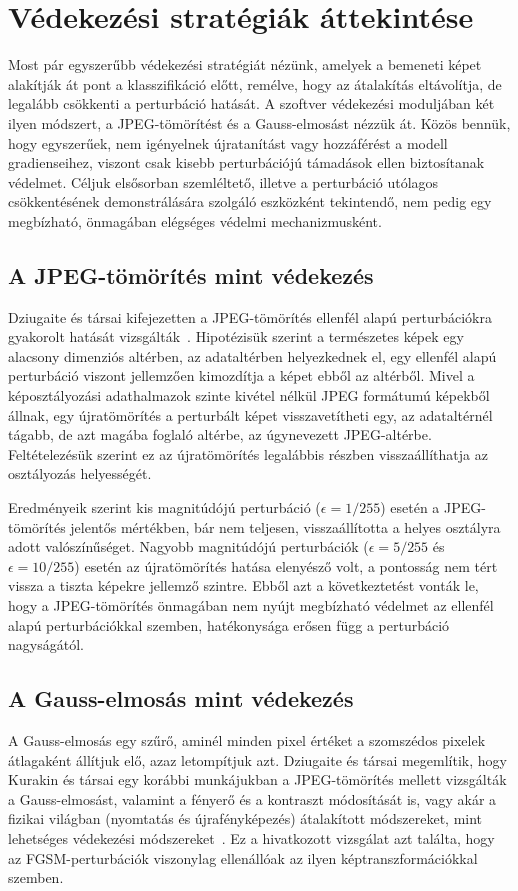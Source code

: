 \section{Védekezési stratégiák áttekintése}
Most pár egyszerűbb védekezési stratégiát nézünk, amelyek a bemeneti képet alakítják át pont a klasszifikáció előtt, remélve, 
hogy az átalakítás eltávolítja, de legalább csökkenti a perturbáció hatását. 
A szoftver védekezési moduljában két ilyen módszert, a JPEG-tömörítést és a Gauss-elmosást nézzük át. 
Közös bennük, hogy egyszerűek, nem igényelnek újratanítást vagy hozzáférést a modell gradienseihez, viszont csak kisebb 
perturbációjú támadások ellen biztosítanak védelmet. 
Céljuk elsősorban szemléltető, illetve a perturbáció utólagos csökkentésének demonstrálására szolgáló eszközként tekintendő, nem 
pedig egy megbízható, önmagában elégséges védelmi mechanizmusként. 

\subsection{A JPEG-tömörítés mint védekezés}
Dziugaite és társai kifejezetten a JPEG-tömörítés ellenfél alapú perturbációkra gyakorolt hatását 
vizsgálták~\cite{dziugaite2016jpeg}. 
Hipotézisük szerint a természetes képek egy alacsony dimenziós altérben, az adataltérben helyezkednek el, egy ellenfél alapú 
perturbáció viszont jellemzően kimozdítja a képet ebből az altérből. 
Mivel a képosztályozási adathalmazok szinte kivétel nélkül JPEG formátumú képekből állnak, egy újratömörítés a perturbált képet 
visszavetítheti egy, az adataltérnél tágabb, de azt magába foglaló altérbe, az úgynevezett JPEG-altérbe. 
Feltételezésük szerint ez az újratömörítés legalábbis részben visszaállíthatja az osztályozás helyességét. 

Eredményeik szerint kis magnitúdójú perturbáció ($\epsilon=1/255$) esetén a JPEG-tömörítés jelentős mértékben, bár nem teljesen, 
visszaállította a helyes osztályra adott valószínűséget. 
Nagyobb magnitúdójú perturbációk ($\epsilon=5/255$ és $\epsilon=10/255$) esetén az újratömörítés hatása elenyésző volt, a 
pontosság nem tért vissza a tiszta képekre jellemző szintre. 
Ebből azt a következtetést vonták le, hogy a JPEG-tömörítés önmagában nem nyújt megbízható védelmet az ellenfél alapú 
perturbációkkal szemben, hatékonysága erősen függ a perturbáció nagyságától. 

\subsection{A Gauss-elmosás mint védekezés}
A Gauss-elmosás egy szűrő, aminél minden pixel értéket a szomszédos pixelek átlagaként állítjuk elő, azaz letompítjuk azt. 
Dziugaite és társai megemlítik, hogy Kurakin és társai egy korábbi munkájukban a JPEG-tömörítés mellett vizsgálták a 
Gauss-elmosást, valamint a fényerő és a kontraszt módosítását is, vagy akár a fizikai világban (nyomtatás és újrafényképezés) 
átalakított módszereket, mint lehetséges védekezési módszereket~\cite{dziugaite2016jpeg}. 
Ez a hivatkozott vizsgálat azt találta, hogy az FGSM-perturbációk viszonylag ellenállóak az ilyen képtranszformációkkal szemben. 

